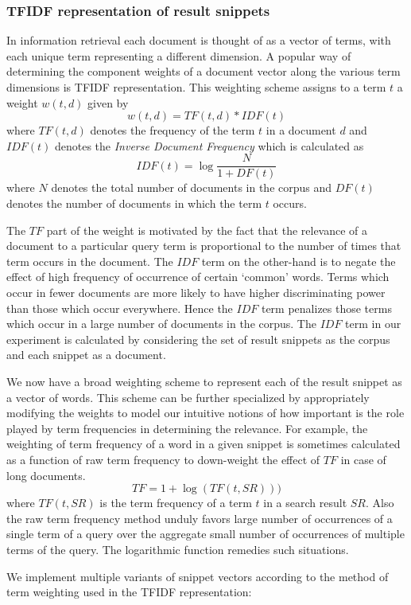 \documentclass[a4paper,12pt]{report}
\begin{document}
\subsubsection{TFIDF representation of result snippets}
In information retrieval each document is thought of as a vector of
terms, with each unique term representing a different dimension. A
popular way of determining the component weights of a document vector
along the various term dimensions is TFIDF representation. This
weighting scheme assigns to a term $t$ a weight $w(t,d)$ given by 
$$ w(t,d) = TF(t,d) * IDF(t) $$
where $TF(t,d)$ denotes the frequency of the term $t$ in a document
$d$ and $IDF(t)$ denotes the {\it Inverse Document Frequency} which is
calculated as 
$$ IDF(t) = \log \frac{N}{1 + DF(t)} $$
where $N$ denotes the total number of documents in the corpus and
$DF(t)$ denotes the number of documents in which the term $t$ occurs. 

The $TF$ part of the weight is motivated by the fact that the
relevance of a document to a particular query term is proportional to
the number of times that term occurs in the document. The $IDF$ term
on the other-hand is to negate the effect of high frequency of
occurrence of certain `common' words. Terms which occur in fewer
documents are more likely to have higher discriminating power than
those which occur everywhere. Hence the $IDF$ term penalizes those
terms which occur in a large number of documents in the corpus. The
$IDF$ term in our experiment is calculated by considering the set of
result snippets as the corpus and each snippet as a document.

We now have a broad weighting scheme to represent each of the result
snippet as a vector of words. This scheme can be further specialized
by appropriately modifying the weights to model our intuitive notions
of how important is the role played by term frequencies in determining
the relevance. For example, the weighting of term frequency of a word
in a given snippet is sometimes calculated as a function of raw term
frequency to down-weight the effect of $TF$ in case of long documents.
$$ TF = 1 + \log (TF(t,SR)))$$ where $TF(t,SR)$ is the term frequency
of a term $t$ in a search result $SR$. Also the raw term frequency
method unduly favors large number of occurrences of a single term of a
query over the aggregate small number of occurrences of multiple terms
of the query. The logarithmic function remedies such
situations\cite{BSA93}.

We implement multiple variants of snippet vectors according to the
method of term weighting used in the TFIDF representation:
\end{document}

